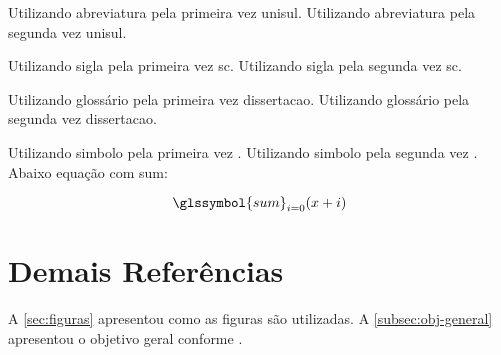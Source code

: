 Utilizando abreviatura pela primeira vez \gls{unisul}. Utilizando abreviatura pela segunda vez \gls{unisul}.

Utilizando sigla pela primeira vez \gls{sc}. Utilizando sigla pela segunda vez \gls{sc}.

Utilizando glossário pela primeira vez \gls{dissertacao}. Utilizando glossário pela segunda vez \gls{dissertacao}.

Utilizando simbolo pela primeira vez . Utilizando simbolo pela segunda vez  \cite{latex-guide}. Abaixo equação com \gls{sum}:

$$
  \glssymbol{sum}_{i=0}(x+i)
$$

\section{Demais Referências} \label{sec:demais-ref}

A \cref{sec:figuras} apresentou como as figuras são utilizadas. A \cref{subsec:obj-general} apresentou o objetivo geral conforme .
